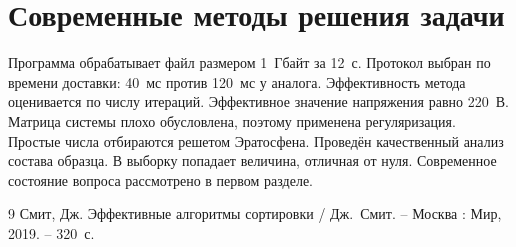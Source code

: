 \section{Современные методы решения задачи}

Программа обрабатывает файл размером 1~Гбайт за 12~с.
Протокол выбран по времени доставки: 40~мс против 120~мс у аналога.
Эффективность метода оценивается по числу итераций.
Эффективное значение напряжения равно 220~В.
Матрица системы плохо обусловлена, поэтому применена регуляризация.
Простые числа отбираются решетом Эратосфена.
Проведён качественный анализ состава образца.
В выборку попадает величина, отличная от нуля.
Современное состояние вопроса рассмотрено в первом разделе.

\begin{thebibliography}{9}
 Смит, Дж. Эффективные алгоритмы сортировки / Дж.~Смит. -- Москва :
Мир, 2019. -- 320~с.
\end{thebibliography}
